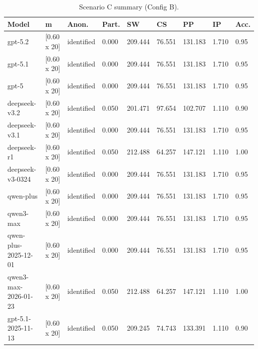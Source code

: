 \begin{table}[t]
  \centering
  \caption{Scenario C summary (Config B).}
  \label{tab:app_sc_c_B}
  \small
  \setlength{\tabcolsep}{4pt}
  \renewcommand{\arraystretch}{1.05}
  \begin{tabular}{p{3.2cm} p{1.6cm} p{1.4cm} p{1.2cm} p{1.25cm} p{1.25cm} p{1.25cm} p{1.25cm} p{1.05cm}}
    \toprule
    Model & m & Anon. & Part. & SW & CS & PP & IP & Acc. \\
    \midrule
    gpt-5.2 & [0.60 x 20] & identified & 0.000 & 209.444 & 76.551 & 131.183 & 1.710 & 0.95 \\
    gpt-5.1 & [0.60 x 20] & identified & 0.000 & 209.444 & 76.551 & 131.183 & 1.710 & 0.95 \\
    gpt-5 & [0.60 x 20] & identified & 0.000 & 209.444 & 76.551 & 131.183 & 1.710 & 0.95 \\
    deepseek-v3.2 & [0.60 x 20] & identified & 0.050 & 201.471 & 97.654 & 102.707 & 1.110 & 0.90 \\
    deepseek-v3.1 & [0.60 x 20] & identified & 0.000 & 209.444 & 76.551 & 131.183 & 1.710 & 0.95 \\
    deepseek-r1 & [0.60 x 20] & identified & 0.050 & 212.488 & 64.257 & 147.121 & 1.110 & 1.00 \\
    deepseek-v3-0324 & [0.60 x 20] & identified & 0.000 & 209.444 & 76.551 & 131.183 & 1.710 & 0.95 \\
    qwen-plus & [0.60 x 20] & identified & 0.000 & 209.444 & 76.551 & 131.183 & 1.710 & 0.95 \\
    qwen3-max & [0.60 x 20] & identified & 0.000 & 209.444 & 76.551 & 131.183 & 1.710 & 0.95 \\
    qwen-plus-2025-12-01 & [0.60 x 20] & identified & 0.000 & 209.444 & 76.551 & 131.183 & 1.710 & 0.95 \\
    qwen3-max-2026-01-23 & [0.60 x 20] & identified & 0.050 & 212.488 & 64.257 & 147.121 & 1.110 & 1.00 \\
    gpt-5.1-2025-11-13 & [0.60 x 20] & identified & 0.050 & 209.245 & 74.743 & 133.391 & 1.110 & 0.90 \\
    \bottomrule
  \end{tabular}
\end{table}


